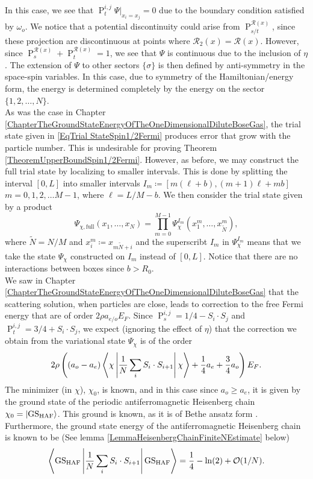 In this case, we see that $ \operatorname{P}_t^{i,j}\Psi\rvert_{x_i=x_j}=0 $ due to the boundary condition satisfied by $ \omega_o $. We notice that a potential discontinuity could arise from $ \operatorname{P}_{s/t}^{\mathcal{R}(x)} $, since these projection are discontinuous at points where $ \mathcal{R}_2(x)=\mathcal{R}(x) $. However, since $ \operatorname{P}_{s}^{\mathcal{R}(x)}+\operatorname{P}_{t}^{\mathcal{R}(x)}=1 $, we see that $ \Psi $ is continuous due to the inclusion of $ \eta $. The extension of $ \Psi $ to other sectors $ \{\sigma\} $ is then defined by anti-symmetry in the space-spin variables. In this case, due to symmetry of the Hamiltonian/energy form, the energy is determined completely by the energy on the sector $ \{1,2,\ldots,N\} $.\\
As was the case in Chapter \ref{ChapterTheGroundStateEnergyOfTheOneDimensionalDiluteBoseGas}, the trial state given in \eqref{EqTrial StateSpin1/2Fermi} produces error that grow with the particle number. This is undesirable for proving Theorem \ref{TheoremUpperBoundSpin1/2Fermi}. However, as before, we may construct the full trial state by localizing to smaller intervals. This is done by splitting the interval $ [0,L] $ into smaller intervals $ I_m\coloneqq[m(\ell+b),(m+1)\ell+mb] $ $ m=0,1,2,\ldots M-1 $, where $ \ell=L/M-b $. We then consider the trial state given by a product \begin{equation}\label{EqFullTrialStateSpin1/2}
\Psi_{\chi,\text{full}}(x_1,\ldots,x_N)=\prod_{m=0}^{M-1}\Psi^{I_m}_{\chi}(x_1^m,\ldots,x_{\tilde{N}}^m),
\end{equation}
where $ \tilde{N}=N/M $ and $ x_i^m\coloneqq x_{m\tilde{N}+i} $ and the superscribt $ I_m $ in $ \Psi^{I_m}_{\chi} $ means that we take the state $ \Psi_{\chi} $ constructed on $ I_m $ instead of $ [0,L] $. Notice that there are no interactions between boxes since $ b>R_0 $.\\
We saw in Chapter \ref{ChapterTheGroundStateEnergyOfTheOneDimensionalDiluteBoseGas} that the scattering solution, when particles are close, leads to correction to the free Fermi energy that are of order $ 2\rho a_{e/o} E_F $. Since $ \operatorname{P}_s^{i,j}=1/4-S_i\cdot S_j $ and $ \operatorname{P}_t^{i,j}=3/4+S_i\cdot S_j $, we expect (ignoring the effect of $ \eta $) that the correction we obtain from the variational state $ \Psi_\chi $ is of the order $$
2\rho\left( (a_o-a_e) \left\langle\chi \left\vert \frac{1}{N}\sum_{i}S_i\cdot S_{i+1} \right\vert \chi\right\rangle +\frac{1}{4}a_e+\frac{3}{4}a_o \right)E_F.
$$ 
The minimizer (in $ \chi $), $ \chi_0 $, is known, and in this case since $ a_o\geq a_e $, it is given by the ground state of the periodic antiferromagnetic Heisenberg chain $ \chi_0=\ket{\text{GS}_{\text{HAF}}} $. This ground is known, as it is of Bethe ansatz form \cite{bethe1931theorie}. Furthermore, the ground state energy of the antiferromagnetic Heisenberg chain is known to be \cite{hult1938,mattis2012theory} (See lemma \ref{LemmaHeisenbergChainFiniteNEstimate} below) \begin{equation}
\left\langle\text{GS}_{\text{HAF}} \left \lvert \frac{1}{N}\sum_{i}S_i\cdot S_{i+1} \right\rvert \text{GS}_{\text{HAF}}\right\rangle=\frac{1}{4}-\ln(2)+\mathcal{O}(1/N).
\end{equation}
